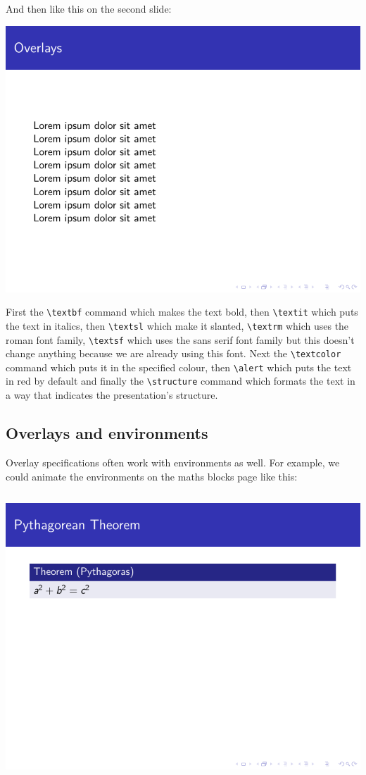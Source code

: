 \begin{column}{0.5\textwidth}
And then like this on the second slide:

\includegraphics[page=2]{examples/beamer/overlay-text-format.pdf}

First the \verb|\textbf| command which makes the text bold, then \verb|\textit| which puts the text in italics, then \verb|\textsl| which make it slanted, \verb|\textrm| which uses the roman font family, \verb|\textsf| which uses the sans serif font family but this doesn't change anything because we are already using this font. Next the \verb|\textcolor| command which puts it in the specified colour, then \verb|\alert| which puts the text in red by default and finally the \verb|\structure| command which formats the text in a way that indicates the presentation's structure.

\subsection{Overlays and environments}

Overlay specifications often work with environments as well. For example, we could animate the environments on the maths blocks page like this:

\inputminted[linenos=true]{latex}{examples/beamer/overlay-environment.tex}

\includegraphics[page=1]{examples/beamer/overlay-environment.pdf}


\end{column}
